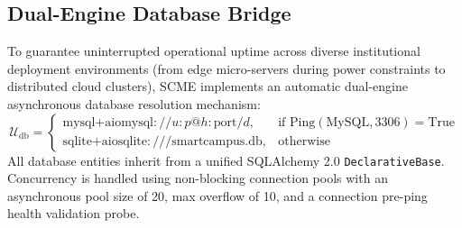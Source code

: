 \documentclass[11pt,a4paper]{article}
\begin{document}
\subsection{Dual-Engine Database Bridge}
To guarantee uninterrupted operational uptime across diverse institutional deployment environments (from edge micro-servers during power constraints to distributed cloud clusters), SCME implements an automatic dual-engine asynchronous database resolution mechanism:
\begin{equation}
\mathcal{U}_{\text{db}} = 
\begin{cases} 
\text{mysql+aiomysql}://u:p@h:\text{port}/d, & \text{if } \text{Ping}(\text{MySQL}, 3306) = \text{True} \\ 
\text{sqlite+aiosqlite}:///\text{smartcampus.db}, & \text{otherwise} 
\end{cases}
\label{eq:db_switch}
\end{equation}
All database entities inherit from a unified SQLAlchemy 2.0 \texttt{DeclarativeBase}. Concurrency is handled using non-blocking connection pools with an asynchronous pool size of 20, max overflow of 10, and a connection pre-ping health validation probe.
\end{document}

